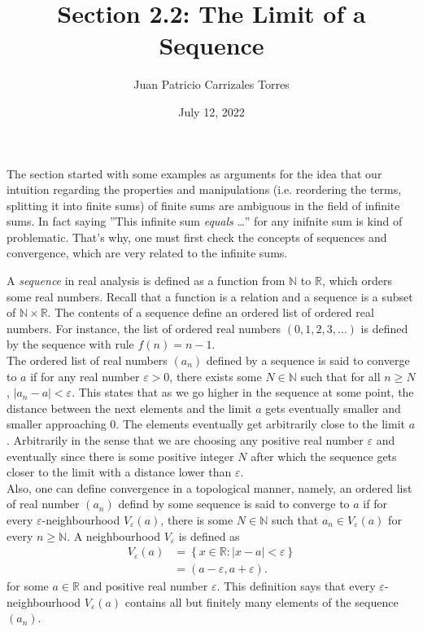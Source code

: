\documentclass[12pt]{article}
\newcommand{\N}{\mathbb{N}}
\newcommand{\R}{\mathbb{R}}
\begin{document}
  
\title{Section 2.2: The Limit of a Sequence}
   \author{Juan Patricio Carrizales Torres}
     \date{July 12, 2022}
       \maketitle
     
       The section started with some examples as arguments for the idea that our intuition regarding the properties and manipulations (i.e. reordering the terms, splitting it into finite sums) of finite sums are ambiguous in the field of infinite sums. In fact saying ''This infinite sum \textit{equals} \dots'' for any inifnite sum is kind of problematic. That's why, one must first check the concepts of sequences and convergence, which are very related to the infinite sums. 

       A \textit{sequence} in real analysis is defined as a function from $\N$ to $\R$, which orders some real numbers. Recall that a function is a relation and a sequence is a subset of $\N \times \R$. The contents of a  sequence define an ordered list of ordered real numbers. For instance, the list of ordered real numbers $(0,1,2,3,\dots)$ is defined by the sequence with rule $f(n) = n-1$. \\

       The ordered list of real numbers $(a_{n})$ defined by a sequence is said to converge to $a$ if for any real number $\varepsilon > 0$, there exists some $N\in \N$ such that for all $n\geq N$, $|a_{n}-a|< \varepsilon$. This states that as we go higher in the sequence at some point, the distance between the next elements and the limit $a$ gets eventually smaller and smaller approaching 0. The elements eventually get arbitrarily close to the limit $a$. Arbitrarily in the sense that we are choosing any positive real number $\varepsilon$ and eventually since there is some positive integer $N$ after which the sequence gets closer to the limit with a distance lower than $\varepsilon$.\\
       Also, one can define convergence in a topological manner, namely, an ordered list of real number $(a_{n})$ defind by some sequence is said to converge to $a$ if for every $\varepsilon$-neighbourhood $V_{\varepsilon}(a)$, there is some $N\in \N$ such that $a_{n} \in V_{\varepsilon}(a)$ for every $n\geq \N$. A neighbourhood $V_{\varepsilon}$ is defined as
    \begin{align*}
      V_{\varepsilon}(a) &= \left\{x\in \R: |x-a|<\varepsilon \right\}\\
      &= (a-\varepsilon,a+\varepsilon).
    \end{align*}
    for some $a\in \R$ and positive real number $\varepsilon$. This definition says that every $\varepsilon$-neighbourhood $V_{\varepsilon}(a)$ contains all but finitely many elements of the sequence $(a_{n})$. 
       
\end{document}
